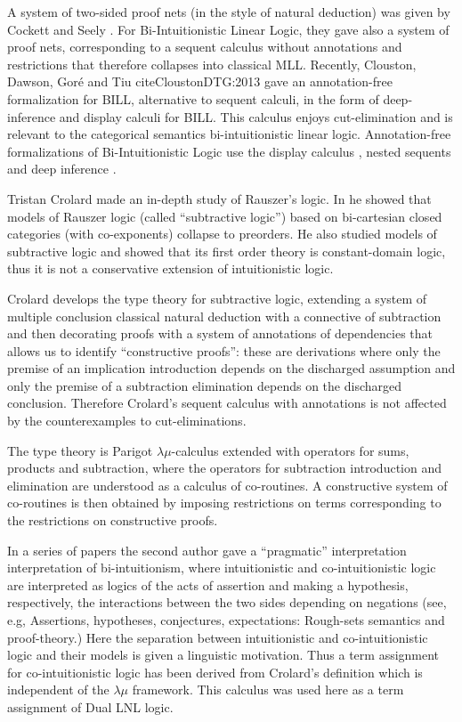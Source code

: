 A system of two-sided proof nets (in the style of natural deduction)
was given by Cockett and Seely \cite{Cockett:1997}.  For
Bi-Intuitionistic Linear Logic, they gave also a system of proof nets,
corresponding to a sequent calculus without annotations and
restrictions that therefore collapses into classical MLL.  Recently,
Clouston, Dawson, Goré and Tiu cite{CloustonDTG:2013} gave an 
annotation-free formalization for BILL, alternative to sequent calculi, 
in the form of deep-inference and display calculi for BILL. This calculus 
enjoys cut-elimination and is relevant to the categorical semantics
bi-intuitionistic linear logic. Annotation-free formalizations of 
Bi-Intuitionistic Logic use the display calculus \cite{Gore:2000}, nested sequents
\cite{GorePT:2008} and deep inference \cite{Postniece:2009}.
 

Tristan Crolard \cite{Crolard:2001,Crolard:2004} made an in-depth
study of Rauszer's logic. In \cite{Crolard:2001} he showed that models
of Rauszer logic (called ``subtractive logic'') based on bi-cartesian
closed categories (with co-exponents) collapse to preorders.  He also
studied models of subtractive logic and showed that its first order
theory is constant-domain logic, thus it is not a conservative
extension of intuitionistic logic.

Crolard \cite{Crolard:2004} develops the type theory for subtractive
logic, extending a system of multiple conclusion classical natural
deduction with a connective of subtraction and then decorating proofs
with a system of annotations of dependencies that allows us to
identify ``constructive proofs'': these are derivations where only the
premise of an implication introduction depends on the discharged
assumption and only the premise of a subtraction elimination depends
on the discharged conclusion. Therefore Crolard's sequent calculus
with annotations is not affected by the counterexamples to
cut-eliminations.

The type theory is Parigot $\lambda\mu$-calculus extended with
operators for sums, products and subtraction, where the operators for
subtraction introduction and elimination are understood as a calculus
of co-routines.  A constructive system of co-routines is then obtained
by imposing restrictions on terms corresponding to the restrictions on
constructive proofs.  

In a series of papers the second author gave a ``pragmatic''
interpretation interpretation of bi-intuitionism, where intuitionistic
and co-intuitionistic logic are interpreted as logics of the acts of
assertion and making a hypothesis, respectively, the interactions
between the two sides depending on negations (see, e.g,
\cite{Bellin:2014} Assertions, hypotheses, conjectures, expectations:
Rough-sets semantics and proof-theory.)  Here the separation between 
intuitionistic and co-intuitionistic logic and their models is given a 
linguistic motivation. Thus a term assignment for co-intuitionistic 
logic has been derived from Crolard's definition which is independent
of the $\lambda\mu$ framework. This calculus was used
here as a term assignment of Dual LNL logic.


